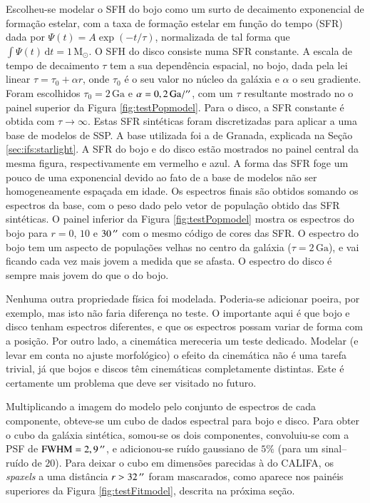 Escolheu-se modelar o SFH do bojo como um surto de decaimento exponencial de
formação estelar, com a taxa de formação estelar em função do tempo (SFR) dada
por $\Psi(t) = A \exp (-t/\tau)$, normalizada de tal forma que $\int
\Psi(t)\,\mathrm{d}t = 1\,\mathrm{M}_\odot$. O SFH do disco consiste numa SFR
constante. A escala de tempo de decaimento $\tau$ tem a sua dependência
espacial, no bojo, dada pela lei linear $\tau = \tau_0 + \alpha r$, onde
$\tau_0$ é o seu valor no núcleo da galáxia e $\alpha$ o seu gradiente. Foram
escolhidos $\tau_0 = 2\,\mathrm{Ga}$ e $\alpha = 0,2\,\mathrm{Ga} / ^{\prime\prime}$, com
um $\tau$ resultante mostrado no o painel superior da Figura
\ref{fig:testPopmodel}. Para o disco, a SFR constante é obtida com
$\tau\to\infty$. Estas SFR sintéticas foram discretizadas para aplicar a uma
base de modelos de SSP. A base utilizada foi a de Granada, explicada na Seção
\ref{sec:ifs:starlight}. A SFR do bojo e do disco estão mostrados no painel
central da mesma figura, respectivamente em vermelho e azul. A forma das SFR
foge um pouco de uma exponencial devido ao fato de a base de modelos não ser
homogeneamente espaçada em idade. Os espectros finais são obtidos somando os
espectros da base, com o peso dado pelo vetor de população obtido das SFR
sintéticas. O painel inferior da Figura \ref{fig:testPopmodel} mostra os
espectros do bojo para $r = 0$, $10$ e $30\,^{\prime\prime}$ com o mesmo código de cores
das SFR. O espectro do bojo tem um aspecto de populações velhas no centro da
galáxia ($\tau = 2\,\mathrm{Ga}$), e vai ficando cada vez mais jovem a medida
que se afasta. O espectro do disco é sempre mais jovem do que o do bojo.

Nenhuma outra propriedade física foi modelada. Poderia-se adicionar poeira, por
exemplo, mas isto não faria diferença no teste. O importante aqui é que bojo e
disco tenham espectros diferentes, e que os espectros possam variar de forma com
a posição. Por outro lado, a cinemática mereceria um teste dedicado. Modelar (e
levar em conta no ajuste morfológico) o efeito da cinemática não é uma tarefa
trivial, já que bojos e discos têm cinemáticas completamente distintas. Este é
certamente um problema que deve ser visitado no futuro.

Multiplicando a imagem do modelo pelo conjunto de espectros de cada componente,
obteve-se um cubo de dados espectral para bojo e disco. Para obter o cubo da
galáxia sintética, somou-se os dois componentes, convoluiu-se com a PSF de
$\mathrm{FWHM} = 2,9\,^{\prime\prime}$, e adicionou-se ruído gaussiano de $5\%$ (para um
sinal--ruído de $20$). Para deixar o cubo em dimensões parecidas à do CALIFA, os
{\em spaxels} a uma distância $r > 32\,^{\prime\prime}$ foram mascarados, como aparece nos
painéis superiores da Figura \ref{fig:testFitmodel}, descrita na próxima seção.

